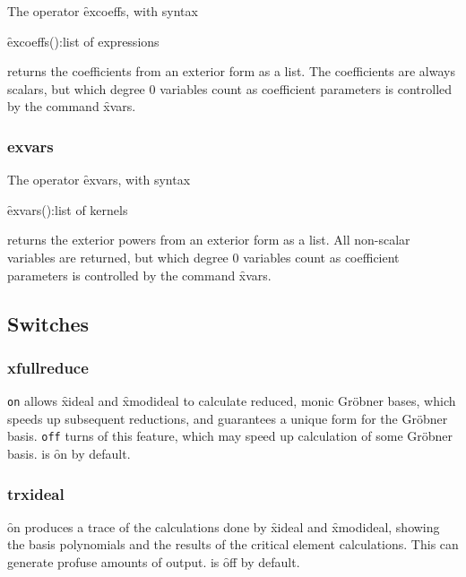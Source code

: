 \hypertarget{operator:EXCOEFFS}{}
The operator \f{excoeffs}, with syntax
\begin{syntax}
     \f{excoeffs}():list of expressions
\end{syntax}
returns the coefficients from an exterior form as a list. The coefficients
are always scalars, but which degree 0 variables count as coefficient
parameters is controlled by the command \f{xvars}.


\subsubsection*{exvars}

\hypertarget{operator:EXVARS}{}
The operator \f{exvars}, with syntax
\begin{syntax}
     \f{exvars}():list of kernels
\end{syntax}
returns the exterior powers from an exterior form as a list. All non-scalar
variables are returned, but which degree 0 variables count as coefficient
parameters is controlled by the command \f{xvars}.


\subsection{Switches} 


\subsubsection*{xfullreduce}

\hypertarget{switch:XFULLREDUCE}{}
\texttt{on}  allows \f{xideal} and \f{xmodideal} to calculate
reduced, monic Gr{\"o}bner bases, which speeds up subsequent reductions, and
guarantees a unique form for the Gr{\"o}bner basis. \texttt{off}  turns
of this feature, which may speed up calculation of some Gr{\"o}bner
basis.  is \f{on} by default.


\subsubsection*{trxideal}

\hypertarget{switch:TRXIDEAL}{}
\f{on}  produces a trace of the calculations done by \f{xideal} and
\f{xmodideal}, showing the basis polynomials and the results of the
critical element calculations. This can generate profuse amounts of output.
 is \f{off} by default.


